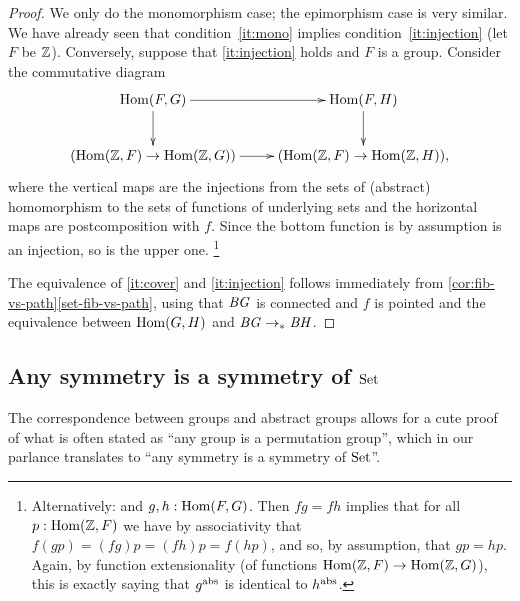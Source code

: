 \begin{proof}
  We only do the monomorphism case; the epimorphism case is very similar.
  We have already seen that condition~\ref{it:mono} implies  condition~\ref{it:injection} (let $F$ be $\mathbb{Z}$).
    Conversely, suppose that \ref{it:injection} holds and $F$ is a group.  Consider the commutative diagram
$$\xymatrix{\Hom(F,G)\ar[r]\ar[d]&\Hom(F,H)\ar[d]\\
  (\Hom(\ZZ,F)\to\Hom(\ZZ,G))\ar[r]&(\Hom(\ZZ,F)\to\Hom(\ZZ,H)),}$$
where the vertical maps are the injections from the sets of (abstract) homomorphism to the sets of functions of underlying sets and the horizontal maps are postcomposition with $f$.  Since the bottom function is by assumption is an injection, so is the upper one.
\footnote{ Alternatively:  and $g,h:\Hom(F,G)$.  Then $fg=fh$ implies that for all $p:\Hom(\ZZ,F)$ we have by associativity that $f(gp)=(fg)p=(fh)p=f(hp)$, and so, by assumption, that $gp=hp$.
  Again, by function extensionality (of functions $\Hom(\ZZ,F)\to\Hom(\ZZ,G)$), this is exactly saying that $g^{\mathrm{abs}}$ is identical to $h^{\mathrm{abs}}$.}

  The equivalence of \ref{it:cover} and \ref{it:injection} follows
immediately from \cref{cor:fib-vs-path}\ref{set-fib-vs-path}, using
that $\mathit{B}\mathit{G}$ is connected and $f$ is pointed and the equivalence between $\Hom(G,H)$ and $\mathit{B}\mathit{G}\to_\ast \mathit{B}\mathit{H}$.
\end{proof}



\subsection{Any symmetry is a symmetry of $\mathrm{Set}$}
\label{sec:groupssubperm}


The correspondence between groups and abstract groups allows for a cute proof of what is often stated as ``any group is a permutation group'', which in our parlance translates to ``any symmetry is a symmetry of $\mathrm{Set}$''.

